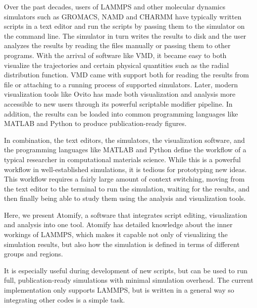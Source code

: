 \documentclass[12pt,a4paper,final]{iopart}
\begin{document}
Over the past decades, users of LAMMPS\cite{Plimpton1995Fast} and other molecular dynamics simulators such as GROMACS, NAMD and CHARMM\cite{berendsen1995gromacs, Phillips2005Scalable, brooks2009charmm} have
typically written scripts in a text editor and run the scripts by passing them to the simulator
on the command line.
The simulator in turn writes the results to disk and the user analyzes the results
by reading the files manually or passing them to other programs.
With the arrival of software like VMD,\cite{Humphrey1996Vmd}
it became easy to both visualize the trajectories and certain 
physical quantities such as the radial distribution function.
VMD came with support both for reading the results from file or attaching to a
running process of supported simulators.
Later, modern visualization tools like Ovito\cite{Stukowski2009Visualization} has made both visualization and analysis more
accessible to new users through its powerful scriptable modifier pipeline.
In addition, the results can be loaded into common programming languages like MATLAB and Python
to produce publication-ready figures.

In combination, the text editors, the simulators, the visualization software, and the programming
languages like MATLAB and Python define the workflow of a typical researcher in computational
materials science.
While this is a powerful workflow in well-established simulations,
it is tedious for prototyping new ideas.
This workflow requires a fairly large amount of context switching,
moving from the text editor to the terminal to run the simulation,
waiting for the results, and then finally being able to study them using the analysis
and visualization tools.

Here, we present Atomify, a software that integrates script editing,
visualization and analysis into one tool.
Atomify has detailed knowledge about the inner workings of LAMMPS,
which makes it capable not only of visualizing the simulation results,
but also how the simulation is defined in terms of different groups and regions.

It is especially useful during development of new scripts, but can be used
to run full, publication-ready simulations with minimal simulation overhead.
The current implementation only supports LAMMPS, but is written in a general
way so integrating other codes is a simple task.
\end{document}
